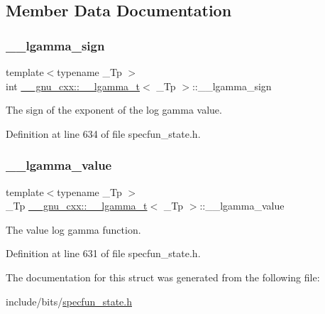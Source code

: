 \subsection{Member Data Documentation}
\mbox{\label{struct____gnu__cxx_1_1____lgamma__t_a8aecdc9e5f69e729e96dc50f0c57b331}} 
\subsubsection{\texorpdfstring{\+\_\+\+\_\+lgamma\+\_\+sign}{\_\_lgamma\_sign}}
{\footnotesize\ttfamily template$<$typename \+\_\+\+Tp $>$ \\
int \hyperlink{struct____gnu__cxx_1_1____lgamma__t}{\+\_\+\+\_\+gnu\+\_\+cxx\+::\+\_\+\+\_\+lgamma\+\_\+t}$<$ \+\_\+\+Tp $>$\+::\+\_\+\+\_\+lgamma\+\_\+sign}



The sign of the exponent of the log gamma value. 



Definition at line 634 of file specfun\+\_\+state.\+h.

\mbox{\label{struct____gnu__cxx_1_1____lgamma__t_a916af5560acafd8dcf25c42fd28deef5}} 
\subsubsection{\texorpdfstring{\+\_\+\+\_\+lgamma\+\_\+value}{\_\_lgamma\_value}}
{\footnotesize\ttfamily template$<$typename \+\_\+\+Tp $>$ \\
\+\_\+\+Tp \hyperlink{struct____gnu__cxx_1_1____lgamma__t}{\+\_\+\+\_\+gnu\+\_\+cxx\+::\+\_\+\+\_\+lgamma\+\_\+t}$<$ \+\_\+\+Tp $>$\+::\+\_\+\+\_\+lgamma\+\_\+value}



The value log gamma function. 



Definition at line 631 of file specfun\+\_\+state.\+h.



The documentation for this struct was generated from the following file\+:\begin{DoxyCompactItemize}
\item 
include/bits/\hyperlink{specfun__state_8h}{specfun\+\_\+state.\+h}\end{DoxyCompactItemize}
